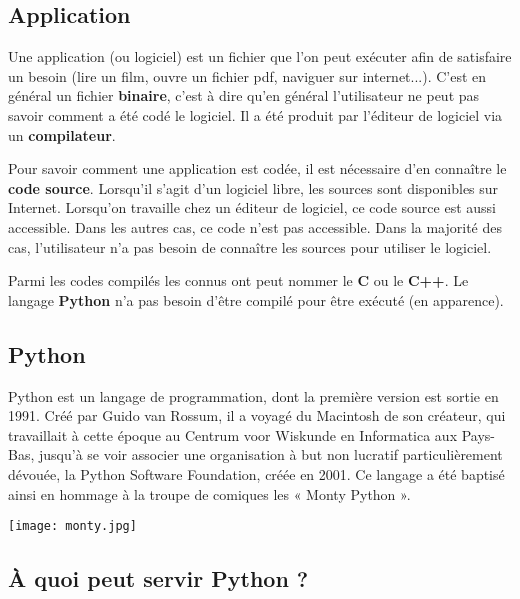\subsection{Application}
Une application (ou logiciel) est un fichier que l'on peut exécuter afin de satisfaire un besoin (lire un film, ouvre un fichier pdf, naviguer sur internet...). C'est en général un fichier \textbf{binaire}, c'est à dire qu'en général l'utilisateur ne peut pas savoir comment a été codé le logiciel. Il a été produit par l'éditeur de logiciel via un \textbf{compilateur}.

Pour savoir comment une application est codée, il est nécessaire d'en connaître le \textbf{code source}.  Lorsqu'il s'agit d'un logiciel libre, les sources sont disponibles sur Internet. Lorsqu'on travaille chez un éditeur de logiciel, ce code source est aussi accessible. Dans les autres cas, ce code n'est pas accessible. Dans la majorité des cas, l'utilisateur n'a pas besoin de connaître les sources pour utiliser le logiciel. 

Parmi les codes compilés les connus ont peut nommer le \textbf{C} ou le \textbf{C++}. Le langage \textbf{Python} n'a pas besoin d'être compilé pour être exécuté (en apparence). 




\subsection{Python}
\begin{minipage}[c]{.79\linewidth}

Python est un langage de programmation, dont la première version est sortie en 1991. Créé par Guido van Rossum, il a voyagé du Macintosh de son créateur, qui travaillait à cette époque au Centrum voor Wiskunde en Informatica aux Pays-Bas, jusqu'à se voir associer une organisation à but non lucratif particulièrement dévouée, la Python Software Foundation, créée en 2001. Ce langage a été baptisé ainsi en hommage à la troupe de comiques les « Monty Python ».
\end{minipage} \hfill
\begin{minipage}[c]{.2\linewidth}
\begin{center}
\texttt{[image: monty.jpg]}
\end{center}
\end{minipage}

\subsection{À quoi peut servir Python ?}




